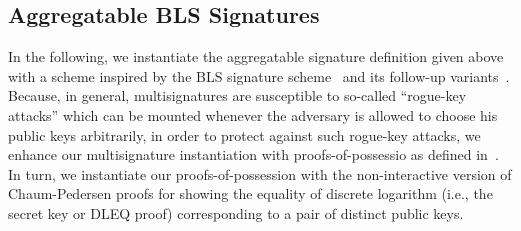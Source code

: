 \subsection{Aggregatable BLS Signatures}
\label{sec:bls}
\noindent In the following, we instantiate the aggregatable signature definition given above with a scheme inspired by the BLS signature
scheme~\cite{BLS_signatures} and its follow-up variants~\cite{proofs_of_posession,boneh_compact_multisig}.
Because, in general, multisignatures are susceptible to so-called ``rogue-key attacks'' which can be
mounted whenever the adversary is allowed to choose his public keys arbitrarily, in order to protect against such
rogue-key attacks, we enhance our multisignature instantiation with proofs-of-possessio as defined in~\cite{proofs_of_posession}.
In turn, we instantiate our proofs-of-possession with the non-interactive version of Chaum-Pedersen proofs for showing 
the equality of discrete logarithm (i.e., the secret key or DLEQ proof) corresponding to a pair of distinct public keys.


